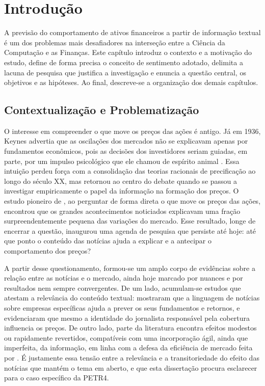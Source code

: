 \chapter{Introdução} \label{chap:introducao}

A previsão do comportamento de ativos financeiros a partir de informação textual é um dos problemas mais desafiadores na interseção entre a Ciência da Computação e as Finanças. Este capítulo introduz o contexto e a motivação do estudo, define de forma precisa o conceito de sentimento adotado, delimita a lacuna de pesquisa que justifica a investigação e enuncia a questão central, os objetivos e as hipóteses. Ao final, descreve-se a organização dos demais capítulos.

\section{Contextualização e Problematização}

O interesse em compreender o que move os preços das ações é antigo. Já em 1936, Keynes advertia que as oscilações dos mercados não se explicavam apenas por fundamentos econômicos, pois as decisões dos investidores seriam guiadas, em parte, por um impulso psicológico que ele chamou de espírito animal \cite{keynes_general_1936}. Essa intuição perdeu força com a consolidação das teorias racionais de precificação ao longo do século XX, mas retornou ao centro do debate quando se passou a investigar empiricamente o papel da informação na formação dos preços. O estudo pioneiro de , ao perguntar de forma direta o que move os preços das ações, encontrou que os grandes acontecimentos noticiados explicavam uma fração surpreendentemente pequena das variações do mercado. Esse resultado, longe de encerrar a questão, inaugurou uma agenda de pesquisa que persiste até hoje: até que ponto o conteúdo das notícias ajuda a explicar e a antecipar o comportamento dos preços?

A partir desse questionamento, formou-se um amplo corpo de evidências sobre a relação entre as notícias e o mercado, ainda hoje marcado por nuances e por resultados nem sempre convergentes. De um lado, acumulam-se estudos que atestam a relevância do conteúdo textual:  mostraram que a linguagem de notícias sobre empresas específicas ajuda a prever os seus fundamentos e retornos, e  evidenciaram que mesmo a identidade do jornalista responsável pela cobertura influencia os preços. De outro lado, parte da literatura encontra efeitos modestos ou rapidamente revertidos, compatíveis com uma incorporação ágil, ainda que imperfeita, da informação, em linha com a defesa da eficiência de mercado feita por . É justamente essa tensão entre a relevância e a transitoriedade do efeito das notícias que mantém o tema em aberto, e que esta dissertação procura esclarecer para o caso específico da PETR4.

